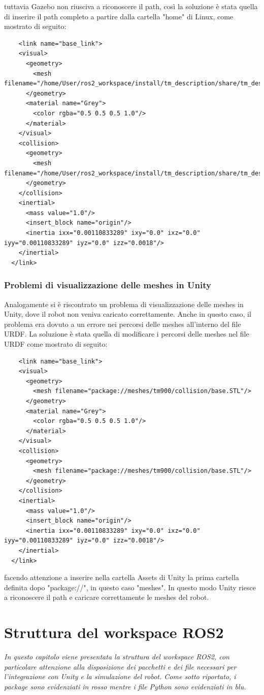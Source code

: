 \documentclass[11pt]{report}
\begin{document}
tuttavia Gazebo non riusciva a riconoscere il path, così la soluzione è stata quella di inserire il path completo a partire dalla cartella "home" di Linux, come mostrato di seguito:
\begin{verbatim}
    <link name="base_link">
    <visual>
      <geometry>
        <mesh filename="/home/User/ros2_workspace/install/tm_description/share/tm_description/meshes/tm900/visual/Base.STL"/>
      </geometry>
      <material name="Grey">
        <color rgba="0.5 0.5 0.5 1.0"/>
      </material>
    </visual>
    <collision>
      <geometry>
        <mesh filename="/home/User/ros2_workspace/install/tm_description/share/tm_description/meshes/tm900/collision/base.STL"/>
      </geometry>
    </collision>
    <inertial>
      <mass value="1.0"/>
      <insert_block name="origin"/>
      <inertia ixx="0.00110833289" ixy="0.0" ixz="0.0" iyy="0.00110833289" iyz="0.0" izz="0.0018"/>
    </inertial>
  </link>
\end{verbatim}
\subsection{Problemi di visualizzazione delle meshes in Unity}
Analogamente si è riscontrato un problema di visualizzazione delle meshes in Unity, dove il robot non veniva caricato correttamente. Anche in questo caso, il problema era dovuto a un errore nei percorsi delle meshes all'interno del file URDF. La soluzione è stata quella di modificare i percorsi delle meshes nel file URDF come mostrato di seguito:

\begin{verbatim}
    <link name="base_link">
    <visual>
      <geometry>
        <mesh filename="package://meshes/tm900/collision/base.STL"/>
      </geometry>
      <material name="Grey">
        <color rgba="0.5 0.5 0.5 1.0"/>
      </material>
    </visual>
    <collision>
      <geometry>
        <mesh filename="package://meshes/tm900/collision/base.STL"/>
      </geometry>
    </collision>
    <inertial>
      <mass value="1.0"/>
      <insert_block name="origin"/>
      <inertia ixx="0.00110833289" ixy="0.0" ixz="0.0" iyy="0.00110833289" iyz="0.0" izz="0.0018"/>
    </inertial>
  </link>
\end{verbatim}

facendo attenzione a inserire nella cartella Assets di Unity la prima cartella definita dopo "package://", in questo caso "meshes". In questo modo Unity riesce a riconoscere il path e caricare correttamente le meshes del robot.
\chapter{Struttura del workspace ROS2}
\textit{In questo capitolo viene presentata la struttura del workspace ROS2, con particolare attenzione alla disposizione dei pacchetti e dei file necessari per l'integrazione con Unity e la simulazione del robot. Come sotto riportato, i package sono evidenziati in rosso mentre i file Python sono evidenziati in blu.}
\end{document}
